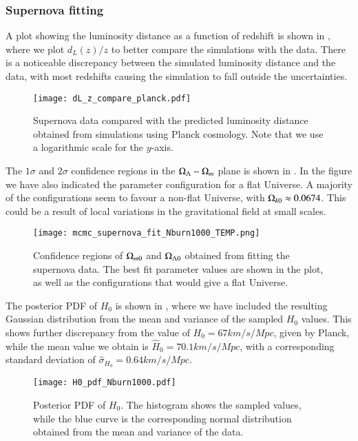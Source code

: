 \subsubsection{Supernova fitting}

A plot showing the luminosity distance as a function of redshift is shown in , where we plot $d_L(z)/z$ to better compare the simulations with the data. There is a noticeable discrepancy between the simulated luminosity distance and the data, with most redshifts causing the simulation to fall outside the uncertainties.       
\begin{figure}[ht!]
    \texttt{[image: dL\_z\_compare\_planck.pdf]}
    \caption{Supernova data compared with the predicted luminosity distance obtained from simulations using Planck cosmology. Note that we use a logarithmic scale for the $y$-axis.}
    \label{fig:M1:dL_of_z_data_vs_Planck}
\end{figure}

The $1\sigma$ and $2\sigma$ confidence regions in the $\Omega_{\Lambda}-\Omega_{m}$ plane is shown in . In the figure we have also indicated the parameter configuration for a flat Universe. A majority of the configurations seem to favour a non-flat Universe, with $\Omega_{k0}\approx 0.0674$. This could be a result of local variations in the gravitational field at small scales.      
\begin{figure}[ht!]
    \texttt{[image: mcmc\_supernova\_fit\_Nburn1000\_TEMP.png]}
    \caption{Confidence regions of $\Omega_{m0}$ and $\Omega_{\Lambda 0}$ obtained from fitting the supernova data. The best fit parameter values are shown in the plot, as well as the configurations that would give a flat Universe.}
    \label{fig:M1:oM_oL_plane}
\end{figure}

The posterior PDF of $H_0$ is shown in , where we have included the resulting Gaussian distribution from the mean and variance of the sampled $H_0$ values. This shows further discrepancy from the value of $H_0=67\unit{km/s/Mpc}$, given by Planck, while the mean value we obtain is $\hat{H}_0=70.1\unit{km/s/Mpc}$, with a corresponding standard deviation of $\hat{\sigma}_{H_0}=0.64\unit{km/s/Mpc}$.       
\begin{figure}[ht!]
    \texttt{[image: H0\_pdf\_Nburn1000.pdf]}    
    \caption{Posterior PDF of $H_0$. The histogram shows the sampled values, while the blue curve is the corresponding normal distribution obtained from the mean and variance of the data.}
    \label{fig:M1:H0_posterior_pdf}
\end{figure}


